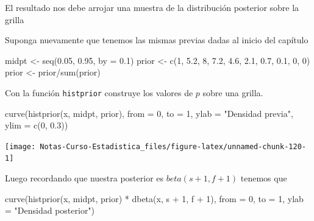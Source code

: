 \documentclass[
  12pt,
]{book}
\newenvironment{Shaded}{\begin{snugshade}}{\end{snugshade}}
\newcommand{\AttributeTok}[1]{\textcolor[rgb]{0.77,0.63,0.00}{#1}}
\newcommand{\DecValTok}[1]{\textcolor[rgb]{0.00,0.00,0.81}{#1}}
\newcommand{\FloatTok}[1]{\textcolor[rgb]{0.00,0.00,0.81}{#1}}
\newcommand{\FunctionTok}[1]{\textcolor[rgb]{0.00,0.00,0.00}{#1}}
\newcommand{\NormalTok}[1]{#1}
\newcommand{\OtherTok}[1]{\textcolor[rgb]{0.56,0.35,0.01}{#1}}
\newcommand{\SpecialCharTok}[1]{\textcolor[rgb]{0.00,0.00,0.00}{#1}}
\newcommand{\StringTok}[1]{\textcolor[rgb]{0.31,0.60,0.02}{#1}}
\theoremstyle{definition}
\theoremstyle{definition}
\theoremstyle{definition}
\theoremstyle{remark}
\begin{document}
El resultado nos debe arrojar una muestra de la distribución posterior
sobre la grilla

Suponga nuevamente que tenemos las mismas previas dadas al inicio del
capítulo

\begin{Shaded}
\begin{Highlighting}[]
\NormalTok{midpt }\OtherTok{\textless{}{-}} \FunctionTok{seq}\NormalTok{(}\FloatTok{0.05}\NormalTok{, }\FloatTok{0.95}\NormalTok{, }\AttributeTok{by =} \FloatTok{0.1}\NormalTok{)}
\NormalTok{prior }\OtherTok{\textless{}{-}} \FunctionTok{c}\NormalTok{(}\DecValTok{1}\NormalTok{, }\FloatTok{5.2}\NormalTok{, }\DecValTok{8}\NormalTok{, }\FloatTok{7.2}\NormalTok{, }\FloatTok{4.6}\NormalTok{, }\FloatTok{2.1}\NormalTok{, }\FloatTok{0.7}\NormalTok{, }\FloatTok{0.1}\NormalTok{, }\DecValTok{0}\NormalTok{, }\DecValTok{0}\NormalTok{)}
\NormalTok{prior }\OtherTok{\textless{}{-}}\NormalTok{ prior}\SpecialCharTok{/}\FunctionTok{sum}\NormalTok{(prior)}
\end{Highlighting}
\end{Shaded}

Con la función \texttt{histprior} construye los valores de \(p\) sobre una
grilla.

\begin{Shaded}
\begin{Highlighting}[]
\FunctionTok{curve}\NormalTok{(}\FunctionTok{histprior}\NormalTok{(x, midpt, prior), }\AttributeTok{from =} \DecValTok{0}\NormalTok{, }\AttributeTok{to =} \DecValTok{1}\NormalTok{, }
    \AttributeTok{ylab =} \StringTok{"Densidad previa"}\NormalTok{, }\AttributeTok{ylim =} \FunctionTok{c}\NormalTok{(}\DecValTok{0}\NormalTok{, }\FloatTok{0.3}\NormalTok{))}
\end{Highlighting}
\end{Shaded}

\begin{center}\texttt{[image: Notas-Curso-Estadistica\_files/figure-latex/unnamed-chunk-120-1]} \end{center}

Luego recordando que nuestra posterior es \(beta(s+1,f+1)\) tenemos que

\begin{Shaded}
\begin{Highlighting}[]
\FunctionTok{curve}\NormalTok{(}\FunctionTok{histprior}\NormalTok{(x, midpt, prior) }\SpecialCharTok{*} \FunctionTok{dbeta}\NormalTok{(x, s }\SpecialCharTok{+} \DecValTok{1}\NormalTok{, }
\NormalTok{    f }\SpecialCharTok{+} \DecValTok{1}\NormalTok{), }\AttributeTok{from =} \DecValTok{0}\NormalTok{, }\AttributeTok{to =} \DecValTok{1}\NormalTok{, }\AttributeTok{ylab =} \StringTok{"Densidad posterior"}\NormalTok{)}
\end{Highlighting}
\end{Shaded}
\end{document}
